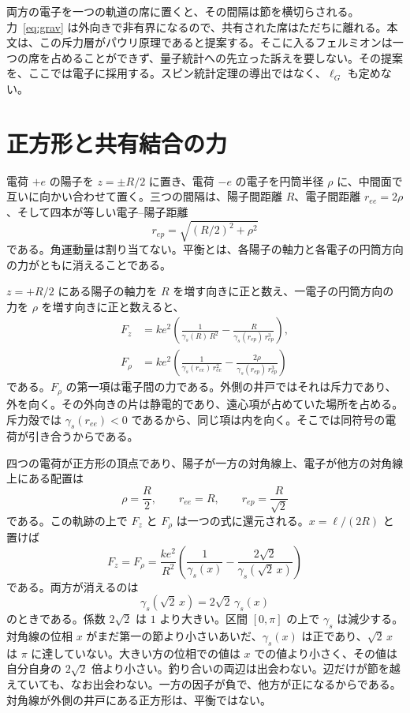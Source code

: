 \documentclass[a4paper]{article}
\begin{document}
両方の電子を一つの軌道の席に置くと、その間隔は節を横切らされる。力~\eqref{eq:grav} は外向きで非有界になるので、共有された席はただちに離れる。本文は、この斥力層がパウリ原理であると提案する。そこに入るフェルミオンは一つの席を占めることができず、量子統計への先立った訴えを要しない。その提案を、ここでは電子に採用する。スピン統計定理の導出ではなく、\(\ell_G\) も定めない。

\section{正方形と共有結合の力}
\label{sec:covalent}

電荷 \(+e\) の陽子を \(z=\pm R/2\) に置き、電荷 \(-e\) の電子を円筒半径 \(\rho\) に、中間面で互いに向かい合わせて置く。三つの間隔は、陽子間距離 \(R\)、電子間距離 \(r_{ee}=2\rho\)、そして四本が等しい電子--陽子距離
\[
r_{ep}=\sqrt{(R/2)^{2}+\rho^{2}}
\]
である。角運動量は割り当てない。平衡とは、各陽子の軸力と各電子の円筒方向の力がともに消えることである。

\(z=+R/2\) にある陽子の軸力を \(R\) を増す向きに正と数え、一電子の円筒方向の力を \(\rho\) を増す向きに正と数えると、
\begin{align}
F_z
  &=k e^{2}\left(
    \frac{1}{\gamma_s(R)\,R^{2}}
    -\frac{R}{\gamma_s(r_{ep})\,r_{ep}^{3}}
  \right),
\label{eq:Faxial}\\
F_{\rho}
  &=k e^{2}\left(
    \frac{1}{\gamma_s(r_{ee})\,r_{ee}^{2}}
    -\frac{2\rho}{\gamma_s(r_{ep})\,r_{ep}^{3}}
  \right)
\label{eq:Frho}
\end{align}
である。\(F_{\rho}\) の第一項は電子間の力である。外側の井戸ではそれは斥力であり、外を向く。その外向きの片は静電的であり、遠心項が占めていた場所を占める。斥力殻では \(\gamma_s(r_{ee})<0\) であるから、同じ項は内を向く。そこでは同符号の電荷が引き合うからである。

四つの電荷が正方形の頂点であり、陽子が一方の対角線上、電子が他方の対角線上にある配置は
\begin{equation}
\label{eq:square}
\rho=\frac{R}{2},
\qquad
r_{ee}=R,
\qquad
r_{ep}=\frac{R}{\sqrt{2}}
\end{equation}
である。この軌跡の上で \(F_z\) と \(F_{\rho}\) は一つの式に還元される。\(x=\ell/(2R)\) と置けば
\begin{equation}
\label{eq:squareF}
F_z=F_{\rho}
  =\frac{k e^{2}}{R^{2}}
  \left(
    \frac{1}{\gamma_s(x)}
    -\frac{2\sqrt{2}}{\gamma_s(\sqrt{2}\,x)}
  \right)
\end{equation}
である。両方が消えるのは
\begin{equation}
\label{eq:squarecond}
\gamma_s(\sqrt{2}\,x)=2\sqrt{2}\,\gamma_s(x)
\end{equation}
のときである。係数 \(2\sqrt{2}\) は \(1\) より大きい。区間 \([0,\pi]\) の上で \(\gamma_s\) は減少する。対角線の位相 \(x\) がまだ第一の節より小さいあいだ、\(\gamma_s(x)\) は正であり、\(\sqrt{2}\,x\) は \(\pi\) に達していない。大きい方の位相での値は \(x\) での値より小さく、その値は自分自身の \(2\sqrt{2}\) 倍より小さい。釣り合いの両辺は出会わない。辺だけが節を越えていても、なお出会わない。一方の因子が負で、他方が正になるからである。対角線が外側の井戸にある正方形は、平衡ではない。
\end{document}
